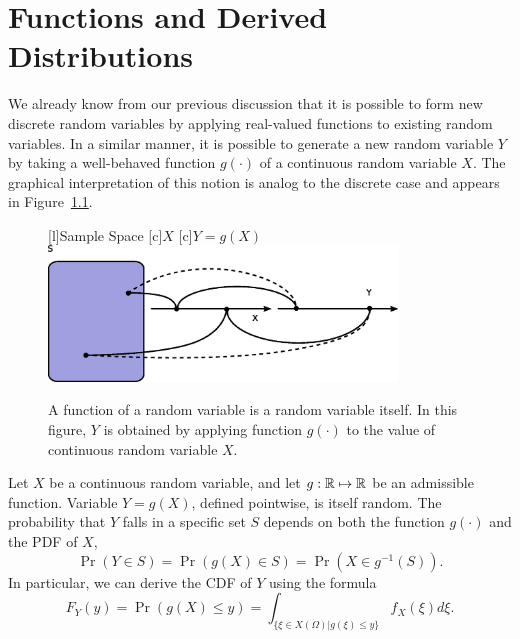 \chapter{Functions and Derived Distributions}

We already know from our previous discussion that it is possible to form new discrete random variables by applying real-valued functions to existing random variables.
In a similar manner, it is possible to generate a new random variable $Y$ by taking a well-behaved function $g(\cdot)$ of a continuous random variable $X$.
The graphical interpretation of this notion is analog to the discrete case and appears in Figure~\ref{figure:FunctionContinuousRV}.

\begin{figure}[ht]
\begin{center}
\begin{psfrags}
[l]{Sample Space}
[c]{$X$}
[c]{$Y = g(X)$}
\includegraphics[width=9.26cm]{Figures/9Chapter/fcn-cnt}
\end{psfrags}
\caption{A function of a random variable is a random variable itself.
In this figure, $Y$ is obtained by applying function $g(\cdot)$ to the value of continuous random variable $X$.}
\label{figure:FunctionContinuousRV}
\end{center}
\end{figure}

Let $X$ be a continuous random variable, and let $g: \mathbb{R} \mapsto \mathbb{R}$ be an admissible function.
Variable $Y = g(X)$, defined pointwise, is itself random.
The probability that $Y$ falls in a specific set $S$ depends on both the function $g(\cdot)$ and the PDF of $X$,
\begin{equation*}
\Pr (Y \in S) = \Pr (g(X) \in S) 
= \Pr \left( X \in g^{-1}(S) \right).
\end{equation*}
In particular, we can derive the CDF of $Y$ using the formula
\begin{equation} \label{equation:DerivedCDF}
F_Y(y) = \Pr (g(X) \leq y) = \int_{ \{ \xi \in X(\Omega) | g(\xi) \leq y \} } f_X(\xi) d\xi .
\end{equation}

